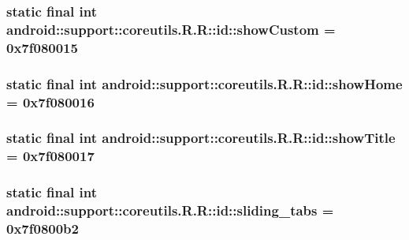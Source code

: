 \hypertarget{classandroid_1_1support_1_1coreutils_1_1_r_1_1id_96b06749049999250bbde7fd4692fe28}{
\subsubsection[{showCustom}]{\setlength{\rightskip}{0pt plus 5cm}static final int android::support::coreutils.R.R::id::showCustom = 0x7f080015}}
\label{classandroid_1_1support_1_1coreutils_1_1_r_1_1id_96b06749049999250bbde7fd4692fe28}


\hypertarget{classandroid_1_1support_1_1coreutils_1_1_r_1_1id_43730a8760f0a5b4ece3067cf5e324f9}{
\subsubsection[{showHome}]{\setlength{\rightskip}{0pt plus 5cm}static final int android::support::coreutils.R.R::id::showHome = 0x7f080016}}
\label{classandroid_1_1support_1_1coreutils_1_1_r_1_1id_43730a8760f0a5b4ece3067cf5e324f9}


\hypertarget{classandroid_1_1support_1_1coreutils_1_1_r_1_1id_86f6f736b08667d5819d28a8caa9cb7e}{
\subsubsection[{showTitle}]{\setlength{\rightskip}{0pt plus 5cm}static final int android::support::coreutils.R.R::id::showTitle = 0x7f080017}}
\label{classandroid_1_1support_1_1coreutils_1_1_r_1_1id_86f6f736b08667d5819d28a8caa9cb7e}


\hypertarget{classandroid_1_1support_1_1coreutils_1_1_r_1_1id_8e3828ca563e717264d99cefff3eff10}{
\subsubsection[{sliding\_\-tabs}]{\setlength{\rightskip}{0pt plus 5cm}static final int android::support::coreutils.R.R::id::sliding\_\-tabs = 0x7f0800b2}}
\label{classandroid_1_1support_1_1coreutils_1_1_r_1_1id_8e3828ca563e717264d99cefff3eff10}


